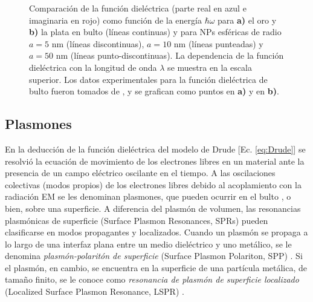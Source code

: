 \begin{figure}[h!]
\begin{subfigure}{.7\linewidth}
	\end{subfigure}\vspace*{-.7em}
	\caption{Comparación de la función dieléctrica (parte real en azul e imaginaria en rojo) como función de la energía $\hbar\omega$ para \textbf{a)} el oro y \textbf{b)} la plata en bulto (líneas continuas) y para NPs esféricas de radio $a=5$ nm (líneas discontinuas), $a=10$ nm (líneas punteadas) y $a=50$ nm (líneas punto-discontinuas). La dependencia de la función dieléctrica con la longitud de onda $\lambda$ se muestra en la escala superior. Los datos experimentales para la función dieléctrica de bulto fueron tomados de \cite{johnson1972constants}, y se grafican como puntos en \textbf{a)} y en \textbf{b)}.}\label{fig:sizeCorrection}
	\end{figure}	

\subsection{Plasmones}
\label{ssection:Plasmones}

En la deducción de la función dieléctrica del modelo de Drude [Ec. \eqref{eq:Drude}] se resolvió la ecuación de movimiento de los electrones libres en un material ante la  presencia de un campo eléctrico oscilante en el tiempo. A las oscilaciones colectivas (modos propios) de los electrones libres debido al acoplamiento con la radiación EM se les denominan  plasmones, que pueden ocurrir en el bulto \cite{stockman2011nanoplasmonics}, o bien, sobre una superficie. A diferencia del plasmón de volumen, las resonancias plasmónicas de superficie (Surface Plasmon Resonances, SPRs) pueden clasificarse en modos propagantes y localizados. Cuando un plasmón se propaga a lo largo de una interfaz plana entre un medio diel\'ectrico y uno met\'alico, se le denomina  \emph{plasm\'on-polarit\'on de superficie} (Surface Plasmon Polariton, SPP) \cite{maier2007plasmonics}.  Si el plasmón, en cambio, se encuentra en la superficie de una partícula  met\'alica, de tamaño finito, se le conoce como \emph{resonancia de plasm\'on de superficie localizado} (Localized Surface Plasmon Resonance, LSPR) \cite{maier2007plasmonics}.

